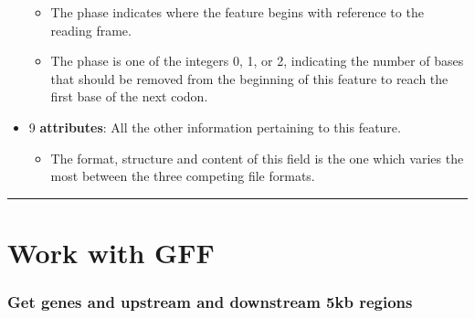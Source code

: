 \documentclass[]{article}
\newenvironment{Shaded}{\begin{snugshade}}{\end{snugshade}}
\newcommand{\KeywordTok}[1]{\textcolor[rgb]{0.13,0.29,0.53}{\textbf{#1}}}
\newcommand{\NormalTok}[1]{#1}
\newcommand{\OperatorTok}[1]{\textcolor[rgb]{0.81,0.36,0.00}{\textbf{#1}}}
\newcommand{\StringTok}[1]{\textcolor[rgb]{0.31,0.60,0.02}{#1}}
\providecommand{\tightlist}{%
  \setlength{\itemsep}{0pt}\setlength{\parskip}{0pt}}
\begin{document}
\begin{itemize}
  \begin{itemize}
  \tightlist
  \item
    The phase indicates where the feature begins with reference to the
    reading frame.
  \item
    The phase is one of the integers 0, 1, or 2, indicating the number
    of bases that should be removed from the beginning of this feature
    to reach the first base of the next codon.
  \end{itemize}
\item
  9 \textbf{attributes}: All the other information pertaining to this
  feature.

  \begin{itemize}
  \tightlist
  \item
    The format, structure and content of this field is the one which
    varies the most between the three competing file formats.
  \end{itemize}
\end{itemize}

\begin{center}\rule{0.5\linewidth}{0.5pt}\end{center}

\hypertarget{work-with-gff}{%
\section{Work with GFF}\label{work-with-gff}}

\begin{Shaded}
\end{Shaded}

\hypertarget{get-genes-and-upstream-and-downstream-5kb-regions}{%
\subsubsection{Get genes and upstream and downstream 5kb
regions}\label{get-genes-and-upstream-and-downstream-5kb-regions}}
\end{document}
